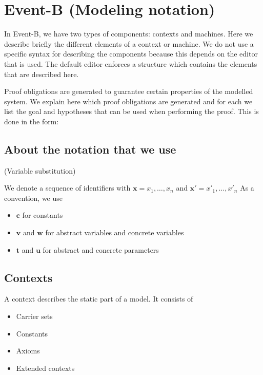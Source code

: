 \newcommand{\varlist}[1]{\textbf{#1}}
\newcommand{\allconstants}{\varlist{c}}
\newcommand{\absvariables}{\varlist{v}}
\newcommand{\concvariables}{\varlist{w}}
\newcommand{\allvariables}{{\absvariables,\concvariables}}
\newcommand{\absparameters}{\varlist{t}}
\newcommand{\concparameters}{\varlist{u}}
\newcommand{\allparameters}{{\absparameters,\concparameters}}

\section{Event-B (Modeling notation)}
\label{reference_02}

In Event-B, we have two types of components: contexts and machines.
Here we describe briefly the different elements of a context or machine.
We do not use a specific syntax for describing the components because this depends on the editor that is
used. The default editor enforces a structure which contains the elements that are described here.

Proof obligations are generated to guarantee certain properties of the modelled system.
We explain here which proof obligations are generated and for each we list the goal and hypotheses that can be used
when performing the proof.
This is done in the form:

\subsection{About the notation that we use}
(Variable substitution)

We denote a sequence of identifiers with $\varlist{x} = x_1,\ldots,x_n$ and $\varlist{x}' = x'_1,\ldots,x'_n$
As a convention, we use
\begin{itemize}
\item $\allconstants$ for constants
\item $\absvariables$ and $\concvariables$ for abstract variables and concrete variables
\item $\absparameters$ and $\concparameters$ for abstract and concrete parameters
\end{itemize}

\subsection{Contexts}
A context describes the static part of a model. It consists of
\begin{itemize}
\item Carrier sets
\item Constants
\item Axioms
\item Extended contexts
\end{itemize}

